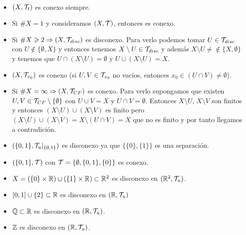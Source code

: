 \begin{ejemplo}\
    \begin{itemize}
        \item $(X, \mathcal{T}_t)$ es conexo siempre.
        \item Si $\#X=1$ y consideramos $(X, \mathcal{T})$, entonces es conexo.
        \item Si $\#X\geqslant 2 \Rightarrow (X, \mathcal{T}_{disc})$ es disconexo. Para verlo podemos tomar $U\in \mathcal{T}_{disc}$ con $U\notin \{\emptyset, X\}$ y entonces tenemos $X\setminus U\in \mathcal{T}_{disc}$ y además $X\setminus U\neq \notin \{X, \emptyset\}$ y tenemos que $U\cap (X\setminus U) = \emptyset$ y $U\cup (X\setminus U) = X$.
        \item $(X, \mathcal{T}_{x_0})$ es conexo (si $U,V\in \mathcal{T}_{x_0}$ no vacíos, entonces $x_0\in (U\cap V) \neq \emptyset$).
        \item Si $\#X=\infty \Rightarrow (X, \mathcal{T}_{CF})$ es conexo. Para verlo supongamos que existen $U,V\in \mathcal{T}_{CF}\setminus \{\emptyset\}$ con $U\cup V =X$ y $U\cap V = \emptyset$. Entonces $X\setminus U$, $X\setminus V$ son finitos y entonces $(X\setminus U)\cup (X\setminus V)$ es finito pero $(X\setminus U)\cup (X\setminus V) = X \setminus (U\cap V) = X$ que no es finito y por tanto llegamos a contradición.
        \item $(\{0,1\}, \mathcal{T}_u|_{\{0,1\}})$ es disconexo ya que $\{\{0\}, \{1\}\}$ es una separación.
        \item $(\{0,1\}, \mathcal{T})$ con $\mathcal{T}=\{\emptyset, \{0,1\}, \{0\}\}$ es conexo.
        \item $X=(\{0\}\times \mathbb{R})\cup (\{1\}\times \mathbb{R})\subset \mathbb{R}^2$ es disconexo en $(\mathbb{R}^2, \mathcal{T}_u)$.
        \item $[0,1]\cup \{2\}\subset \mathbb{R}$ es disconexo en $(\mathbb{R}, \mathcal{T}_u)$ 
        \item $\mathbb{Q}\subset \mathbb{R}$ es disconexo en $(\mathbb{R}, \mathcal{T}_u)$.
        \item $\mathbb{Z}$ es disconexo en $(\mathbb{R}, \mathcal{T}_u)$.
    \end{itemize}
    \endsquare
\end{ejemplo}

